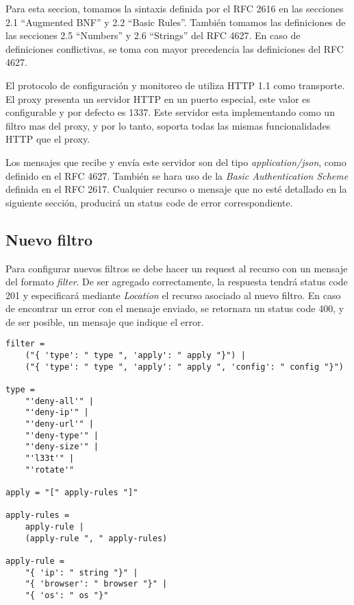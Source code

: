 \documentclass[11pt,a4paper,titlepage]{article}
\begin{document}
Para esta seccion, tomamos la sintaxis definida por el RFC 2616 en las secciones 2.1 ``Augmented BNF'' y 2.2 ``Basic Rules''.
También tomamos las definiciones de las secciones 2.5 ``Numbers'' y 2.6 ``Strings'' del RFC 4627.
En caso de definiciones conflictivas, se toma con mayor precedencia las definiciones del RFC 4627.

El protocolo de configuración y monitoreo de \duta utiliza HTTP 1.1 como transporte.
El proxy presenta un servidor HTTP en un puerto especial, este valor es configurable y por defecto es 1337.
Este servidor esta implementando como un filtro mas del proxy, y por lo tanto, soporta todas las mismas funcionalidades HTTP que el proxy.

Los mensajes que recibe y envía este servidor son del tipo \textit{application/json}, como definido en el RFC 4627.
También se hara uso de la \textit{Basic Authentication Scheme} definida en el RFC 2617.
Cualquier recurso o mensaje que no esté detallado en la siguiente sección, producirá un status code de error correspondiente.

\subsection{Nuevo filtro}
\label{sec:new-filter}
Para configurar nuevos filtros se debe hacer un request  al recurso  con un mensaje del formato \textit{filter}.
De ser agregado correctamente, la respuesta tendrá status code 201 y especificará mediante \textit{Location} el recurso asociado al nuevo filtro.
En caso de encontrar un error con el mensaje enviado, se retornara un status code 400, y de ser posible, un mensaje que indique el error.

\begin{verbatim}
filter =
    ("{ 'type': " type ", 'apply': " apply "}") |
    ("{ 'type': " type ", 'apply': " apply ", 'config': " config "}")

type =
    "'deny-all'" |
    "'deny-ip'" |
    "'deny-url'" |
    "'deny-type'" |
    "'deny-size'" |
    "'l33t'" |
    "'rotate'"

apply = "[" apply-rules "]"

apply-rules =
    apply-rule |
    (apply-rule ", " apply-rules)

apply-rule =
    "{ 'ip': " string "}" |
    "{ 'browser': " browser "}" |
    "{ 'os': " os "}"

\end{verbatim}
\end{document}
